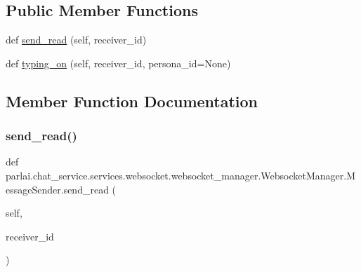 \subsection*{Public Member Functions}
\begin{DoxyCompactItemize}
\item 
def \hyperlink{classparlai_1_1chat__service_1_1services_1_1websocket_1_1websocket__manager_1_1WebsocketManager_1_1MessageSender_ab5aa744f9945196012c2fed3a29779dd}{send\+\_\+read} (self, receiver\+\_\+id)
\item 
def \hyperlink{classparlai_1_1chat__service_1_1services_1_1websocket_1_1websocket__manager_1_1WebsocketManager_1_1MessageSender_a3506683d0a5ab2fd03a585d4bfe51c92}{typing\+\_\+on} (self, receiver\+\_\+id, persona\+\_\+id=None)
\end{DoxyCompactItemize}


\subsection{Member Function Documentation}
\mbox{\label{classparlai_1_1chat__service_1_1services_1_1websocket_1_1websocket__manager_1_1WebsocketManager_1_1MessageSender_ab5aa744f9945196012c2fed3a29779dd}} 
\subsubsection{\texorpdfstring{send\+\_\+read()}{send\_read()}}
{\footnotesize\ttfamily def parlai.\+chat\+\_\+service.\+services.\+websocket.\+websocket\+\_\+manager.\+Websocket\+Manager.\+Message\+Sender.\+send\+\_\+read (\begin{DoxyParamCaption}\item[{}]{self,  }\item[{}]{receiver\+\_\+id }\end{DoxyParamCaption})}

